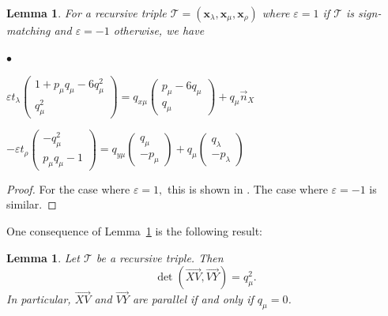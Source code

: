 \documentclass[11pt, reqno]{amsart}
\newtheorem{lemma}[thm]{Lemma}
\theoremstyle{remark}
\numberwithin{equation}{subsection}
\numberwithin{figure}{section}
\theoremstyle{customremark}
\newcommand{\Tt}{\mathcal{T}}
\newenvironment{itemlist}
   { \begin{list} {$\bullet$}
         { \setlength{\topsep}{.5ex}  \setlength{\itemsep}{.5ex} \setlength{\leftmargin}{2.5ex} } }
   { \end{list} }
\newcommand{\vn}{{\vec{n}}}
\newcommand{\ovr}{\overrightarrow}
\newcommand{\la}{{\lambda}}
\newcommand{\eps}{\varepsilon}
\begin{document}
\begin{lemma} \label{lem:complicated} For a recursive triple $\Tt=(\bm{x}_\la,\bm{x}_\mu,\bm{x}_\rho)$ where $\eps=1$ if $\Tt$ is sign-matching and $\eps=-1$ otherwise, we have
\begin{itemlist}
    \item[{(i)}] $\eps t_\la \begin{pmatrix}
               1+p_\mu q_\mu-6q_\mu^2 \\ q_\mu^2\end{pmatrix}=q_{x\mu}\begin{pmatrix}
               p_\mu-6q_\mu \\ q_\mu \end{pmatrix}
               +q_\mu \vn_X$
    \item[{(ii)}] $-\eps t_\rho \begin{pmatrix} -q_\mu^2 \\ p_\mu q_\mu -1 \end{pmatrix}=q_{y\mu} \begin{pmatrix}
        q_\mu \\ - p_\mu
    \end{pmatrix}+q_\mu \begin{pmatrix}
        q_\la \\ -p_\la
    \end{pmatrix}$
\end{itemlist}
\end{lemma}
\begin{proof}
    For the case where $\eps=1,$ this is shown in \cite[Lemma 4.6(vi,vii)]{M1}. The case where $\eps=-1$ is similar. 
\end{proof}

One consequence of Lemma~\ref{lem:complicated} is the following result:
\begin{lemma}\label{lem:notParallel}
Let $\Tt$ be a recursive triple. Then
\[
\det(\ovr{XV},\ovr{VY})=q_\mu^2.
\]
In particular, $\ovr{XV}$ and $\ovr{VY}$ are parallel if and only if $q_\mu=0$.
\end{lemma}
\end{document}
